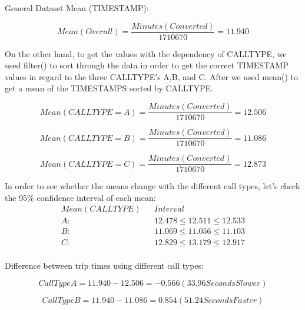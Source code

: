 \documentclass[11pt]{article}
\begin{document}
\par
General Dataset Mean (TIMESTAMP):

\begin{equation}
Mean (Overall) = \frac{Minutes (Converted)}{1710670} = 11.940
\end{equation}

\par
On the other hand, to get the values with the dependency of CALLTYPE, we used filter() to sort through the data in order to get the correct TIMESTAMP values in regard to the three CALLTYPE’s A,B, and C. After we used mean() to get a mean of the TIMESTAMPS sorted by CALLTYPE. 

\begin{equation}
Mean (CALLTYPE = A) = \frac{Minutes (Converted)}{1710670} = 12.506
\end{equation}

\begin{equation}
Mean (CALLTYPE = B) = \frac{Minutes (Converted)}{1710670} = 11.086
\end{equation}

\begin{equation}
Mean (CALLTYPE = C) = \frac{Minutes (Converted)}{1710670} = 12.873
\end{equation}

\par
In order to see whether the means change with the different call types, let's check the 95\% confidence interval of each mean:
\begin{equation*}
	\begin{aligned}
		Mean (CALL TYPE) &&Interval\\
A:  && 12.478 \le 12.511 \le 12.533\\
B: && 11.069 \le 11.056 \le 11.103\\
C:  && 12.829 \le 13.179 \le 12.917\\
	\end{aligned}
\end{equation*}

\par
Difference between trip times using different call types:

\begin{equation}
Call Type A = 11.940 - 12.506 = -0.566 (33.96 Seconds Slower)
\end{equation}

\begin{equation}
Call Type B = 11.940 - 11.086 = 0.854(51.24 Seconds Faster)
\end{equation}
\end{document}
